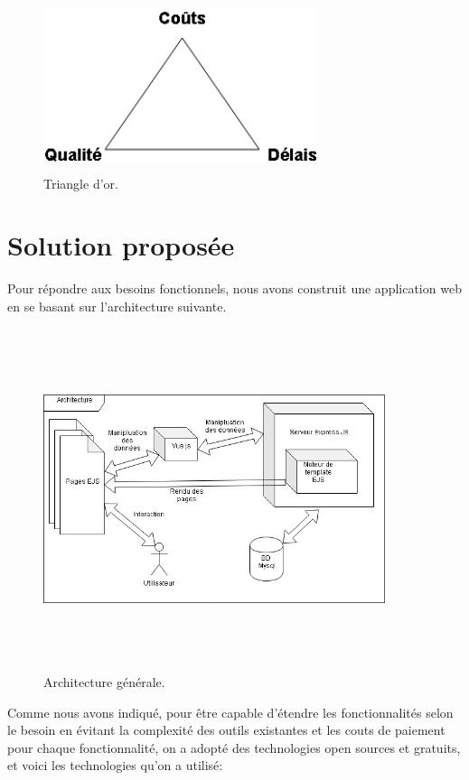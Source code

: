 \begin{figure}[H]
\center
\includegraphics[width=8cm,height=5cm]{./figures/triangle.png}
\caption{Triangle d'or.}
\end{figure}




\section{ Solution propos\'{e}e  }
Pour r\'{e}pondre aux besoins fonctionnels, nous avons construit une application web en
se basant sur l’architecture suivante.


\begin{figure}
\center
\includegraphics[width=10cm,height=10cm]{./figures/archi.png}
\caption{Architecture g\'{e}n\'{e}rale.}
\end{figure}

Comme nous avons indiqu\'{e}, pour \^{e}tre capable d'\'{e}tendre les fonctionnalit\'{e}s
selon le besoin en \'{e}vitant la complexit\'{e} des outils existantes et les couts de
paiement pour chaque fonctionnalit\'{e}, on a adopt\'{e} des technologies open
sources et gratuits, et voici les technologies qu'on a utilis\'{e}:

